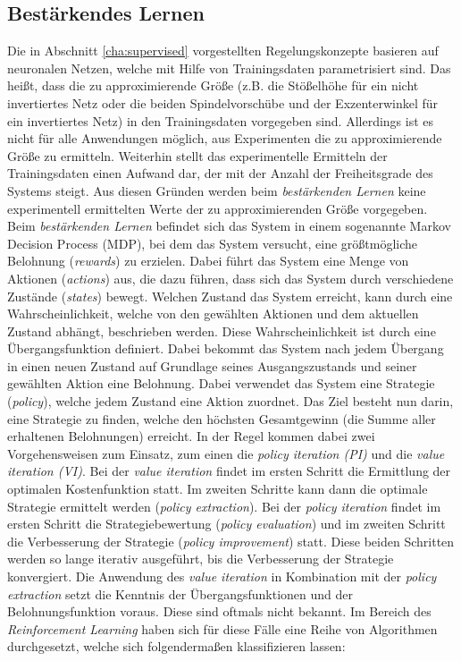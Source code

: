 \subsection{Bestärkendes Lernen}

Die in Abschnitt \ref{cha:supervised} vorgestellten Regelungskonzepte basieren auf neuronalen Netzen, welche mit Hilfe von Trainingsdaten parametrisiert sind. Das heißt, dass die zu approximierende Größe (z.B. die Stößelhöhe für ein nicht invertiertes Netz oder die beiden Spindelvorschübe und der Exzenterwinkel für ein invertiertes Netz) in den Trainingsdaten vorgegeben sind. Allerdings ist es nicht für alle Anwendungen möglich, aus Experimenten die zu approximierende Größe zu ermitteln. Weiterhin stellt das experimentelle Ermitteln der Trainingsdaten einen Aufwand dar, der mit der Anzahl der Freiheitsgrade des Systems steigt. Aus diesen Gründen werden beim \textit{bestärkenden Lernen} keine experimentell ermittelten Werte der zu approximierenden Größe vorgegeben. Beim \textit{bestärkenden Lernen} befindet sich das System in einem sogenannte Markov Decision Process (MDP), bei dem das System versucht, eine größtmögliche Belohnung (\textit{rewards}) zu erzielen. Dabei führt das System eine Menge von Aktionen (\textit{actions}) aus, die dazu führen, dass sich das System durch verschiedene Zustände (\textit{states}) bewegt. Welchen Zustand das System erreicht, kann durch eine Wahrscheinlichkeit, welche von den gewählten Aktionen und dem aktuellen Zustand abhängt, beschrieben werden. Diese Wahrscheinlichkeit ist durch eine Übergangsfunktion definiert. Dabei bekommt das System nach jedem Übergang in einen neuen Zustand auf Grundlage seines Ausgangszustands und seiner gewählten Aktion eine Belohnung. Dabei verwendet das System eine Strategie (\textit{policy}), welche jedem Zustand eine Aktion zuordnet. Das Ziel besteht nun darin, eine Strategie zu finden, welche den höchsten Gesamtgewinn (die Summe aller erhaltenen Belohnungen) erreicht. In der Regel kommen dabei zwei Vorgehensweisen zum Einsatz, zum einen die \textit{policy iteration (PI)} und die \textit{value iteration (VI)}. Bei der \textit{value iteration} findet im ersten Schritt die Ermittlung der optimalen Kostenfunktion statt. Im zweiten Schritte kann dann die optimale Strategie ermittelt werden (\textit{policy extraction}). Bei der \textit{policy iteration} findet im ersten Schritt die Strategiebewertung (\textit{policy evaluation}) und im zweiten Schritt die Verbesserung der Strategie (\textit{policy improvement}) statt. Diese beiden Schritten werden so lange iterativ ausgeführt, bis die Verbesserung der Strategie konvergiert. Die Anwendung des \textit{value iteration} in Kombination mit der \textit{policy extraction} setzt die Kenntnis der Übergangsfunktionen und der Belohnungsfunktion voraus. Diese sind oftmals nicht bekannt. Im Bereich des \textit{Reinforcement Learning} haben sich für diese Fälle eine Reihe von Algorithmen durchgesetzt, welche sich folgendermaßen klassifizieren lassen:

